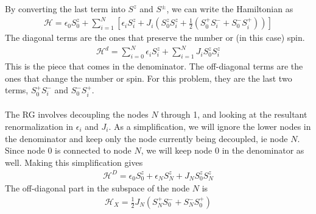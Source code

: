 \documentclass[twoside]{report}
\numberwithin{equation}{section}
\begin{document}
\\\\By converting the last term into \(S^z\) and \(S^\pm\), we can write the Hamiltonian as
\begin{equation}\begin{aligned}
	\mathcal{H} = \epsilon_0 S^z_0 + \sum_{i=1}^N\left[\epsilon_i S^z_i + J_i\left(S^z_0 S^z_i + \frac{1}{2}\left(S_0^+ S^-_i + S_0^- S^+_i\right)\right)\right]
\end{aligned}\end{equation}
The diagonal terms are the ones that preserve the number or (in this case) spin.
\begin{equation}\begin{aligned}
\mathcal{H}^d =\sum_{i=0}^N \epsilon_i S^z_i + \sum_{i=1}^N J_iS^z_0 S^z_i 
\end{aligned}\end{equation}
This is the piece that comes in the denominator. The off-diagonal terms are the ones that change the number or spin. For this problem, they are the last two terms, \(S_0^+ S_i^-\) and \(S_0^- S_i^+\).
\\\\The RG involves decoupling the nodes \(N\) through 1, and looking at the resultant renormalization in \(\epsilon_i\) and \(J_i\). As a simplification, we will ignore the lower nodes in the denominator and keep only the node currently being decoupled, ie node \(N\). Since node \(0\) is connected to node \(N\), we will keep node \(0\) in the denominator as well. Making this simplification gives
\begin{equation}\begin{aligned}
	\label{stardiag}
\mathcal{H}^D =\epsilon_0 S^z_0 + \epsilon_N S^z_N + J_NS^z_0 S^z_N 
\end{aligned}\end{equation}
The off-diagonal part in the subspace of the node \(N\) is
\begin{equation}\begin{aligned}
\mathcal{H}_X = \frac{1}{2}J_N \left(S_N^+ S_0^- + S_N^- S_0^+\right)
\end{aligned}\end{equation}
\end{document}
